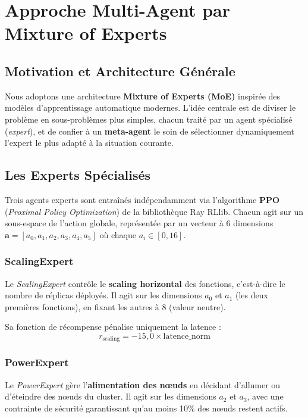 \chapter{Approche Multi-Agent par Mixture of Experts}

\section{Motivation et Architecture Générale}

Nous adoptons une architecture
\textbf{Mixture of Experts (MoE)} inspirée des modèles d'apprentissage
automatique modernes. L'idée centrale est de diviser le problème en
sous-problèmes plus simples, chacun traité par un agent spécialisé
(\textit{expert}), et de confier à un \textbf{meta-agent} le soin de
sélectionner dynamiquement l'expert le plus adapté à la situation courante.

\section{Les Experts Spécialisés}

Trois agents experts sont entraînés indépendamment via l'algorithme
\textbf{PPO} (\textit{Proximal Policy Optimization}) de la bibliothèque
Ray RLlib. Chacun agit sur un sous-espace de l'action globale, représentée
par un vecteur à 6 dimensions $\mathbf{a} = [a_0, a_1, a_2, a_3, a_4, a_5]$
où chaque $a_i \in [0, 16]$.

\subsection{ScalingExpert}

Le \textit{ScalingExpert} contrôle le \textbf{scaling horizontal} des
fonctions, c'est-à-dire le nombre de réplicas déployés. Il agit sur les
dimensions $a_0$ et $a_1$ (les deux premières fonctions), en fixant les
autres à 8 (valeur neutre).

Sa fonction de récompense pénalise uniquement la latence :
\[
r_{\text{scaling}} = -15{,}0 \times \text{latence\_norm}
\]

\subsection{PowerExpert}

Le \textit{PowerExpert} gère l'\textbf{alimentation des nœuds} en décidant
d'allumer ou d'éteindre des nœuds du cluster. Il agit sur les dimensions
$a_2$ et $a_3$, avec une contrainte de sécurité garantissant qu'au moins
10\% des nœuds restent actifs.

